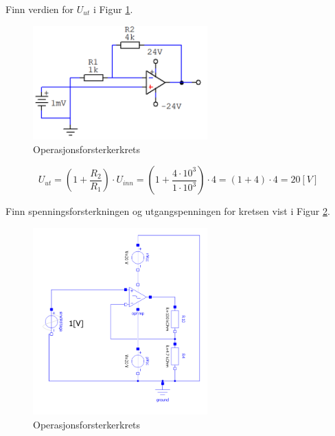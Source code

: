 \begin{question}[name=Oppgave, topic=operasjonsforsterker]
Finn verdien for $U_{ut}$ i Figur \ref{fig:NONinvKrets3}.
	\begin{figure}[H]
		\centering
		\includegraphics[width=0.6\textwidth]{operasjonsforsterker/figurer/NONinvBasic3.png}
		\caption{Operasjonsforsterkerkrets}
		\label{fig:NONinvKrets3}
	\end{figure}

\end{question}

\vspace{0.5cm} %

\begin{solution}[name=Løsningsforslag oppgave]
\[U_{ut}= \left(1+\frac{R_2}{R_1}\right) \cdot U_{inn} = \left(1+\frac{4\cdot 10^3}{1 \cdot 10^3}  \right) \cdot 4 = \left(1+4 \right) \cdot 4 = 20[V]\]
\end{solution}
\vspace{0.5cm} %

\begin{question}[name=Oppgave, topic=operasjonsforsterker]
Finn spenningsforsterkningen og utgangspenningen for kretsen vist i Figur \ref{fig:NONinvKrets4}.
	\begin{figure}[H]
		\centering
		\includegraphics[width=0.6\textwidth]{operasjonsforsterker/figurer/NONinvBasic4.png}
		\caption{Operasjonsforsterkerkrets}
		\label{fig:NONinvKrets4}
	\end{figure}

\end{question}

